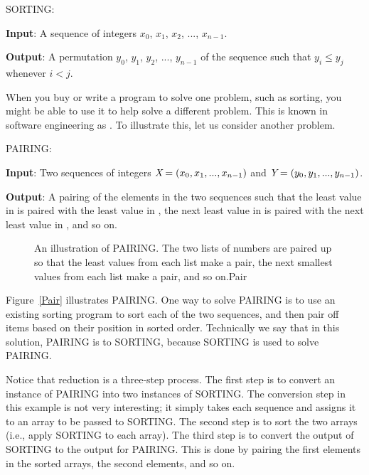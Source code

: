 \begin{inbox}
\noindent SORTING:

\textbf{Input}: A sequence of integers
\(x_0\), \(x_1\), \(x_2\), ..., \(x_{n-1}\).

\textbf{Output}: A permutation \(y_0\), \(y_1\), \(y_2\), ...,
\(y_{n-1}\) of the sequence such that \(y_i \leq y_j\) whenever
\(i < j\).
\end{inbox}

\vspace{-\smallskipamount}
When you buy or write a program to solve one problem, such
as sorting, you might be able to use it to help solve a different
problem.
This is known in software engineering as .
To illustrate this, let us consider another problem.

\begin{inbox}
\noindent PAIRING:

{\bf Input}: Two sequences of integers
\({\textit{X}} = (x_0, x_1, ..., x_{n-1})\) and
\({\textit{Y}} =(y_0, y_1, ..., y_{n-1})\).

{\bf Output}: A pairing of the elements in the two sequences such that
the least value in  is paired with the least value in
, the next least value in  is paired with the next
least value in , and so on.
\end{inbox}

\begin{figure}
\vspace{-\bigskipamount}\vspace{-\smallskipamount}

{An illustration of PAIRING.
The two lists of numbers are paired up so that the least values from each
list make a pair, the next smallest values from each list make a pair,
and so on.}{Pair}
\medskip\smallskip
\end{figure}

Figure~\ref{Pair} illustrates PAIRING.
One way to solve PAIRING is to use an existing sorting
program to sort each of the two sequences, and then pair off
items based on their position in sorted order.
Technically we say that in this solution, PAIRING is
 to SORTING, because SORTING is used to solve
PAIRING.

Notice that reduction is a three-step process.
The first step is to convert an instance of
PAIRING into two instances of SORTING.
The conversion step in this example is not very interesting; it simply
takes each sequence and assigns it to an array to be passed to
SORTING.
The second step is to sort the two arrays (i.e., apply SORTING to each
array).
The third step is to convert the output of SORTING to the output for
PAIRING.
This is done by pairing the first elements in the sorted arrays, the
second elements, and so on.

